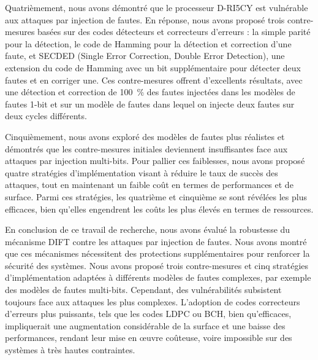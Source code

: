 Quatrièmement, nous avons démontré que le processeur D-RI5CY est vulnérable aux attaques par injection de fautes. En réponse, nous avons proposé trois contre-mesures basées sur des codes détecteurs et correcteurs d’erreurs : la simple parité pour la détection, le code de Hamming pour la détection et correction d’une faute, et SECDED (Single Error Correction, Double Error Detection), une extension du code de Hamming avec un bit supplémentaire pour détecter deux fautes et en corriger une. Ces contre-mesures offrent d'excellents résultats, avec une détection et correction de 100~\% des fautes injectées dans les modèles de fautes 1-bit et sur un modèle de fautes dans lequel on injecte deux fautes sur deux cycles différents.

Cinquièmement, nous avons exploré des modèles de fautes plus réalistes et démontrés que les contre-mesures initiales deviennent insuffisantes face aux attaques par injection multi-bits. Pour pallier ces faiblesses, nous avons proposé quatre stratégies d'implémentation visant à réduire le taux de succès des attaques, tout en maintenant un faible coût en termes de performances et de surface. Parmi ces stratégies, les quatrième et cinquième se sont révélées les plus efficaces, bien qu’elles engendrent les coûts les plus élevés en termes de ressources.

En conclusion de ce travail de recherche, nous avons évalué la robustesse du mécanisme DIFT contre les attaques par injection de fautes. Nous avons montré que ces mécanismes nécessitent des protections supplémentaires pour renforcer la sécurité des systèmes. Nous avons proposé trois contre-mesures et cinq stratégies d’implémentation adaptées à différents modèles de fautes complexes, par exemple des modèles de fautes multi-bits. Cependant, des vulnérabilités subsistent toujours face aux attaques les plus complexes. L’adoption de codes correcteurs d’erreurs plus puissants, tels que les codes LDPC ou BCH, bien qu’efficaces, impliquerait une augmentation considérable de la surface et une baisse des performances, rendant leur mise en œuvre coûteuse, voire impossible sur des systèmes à très hautes contraintes.